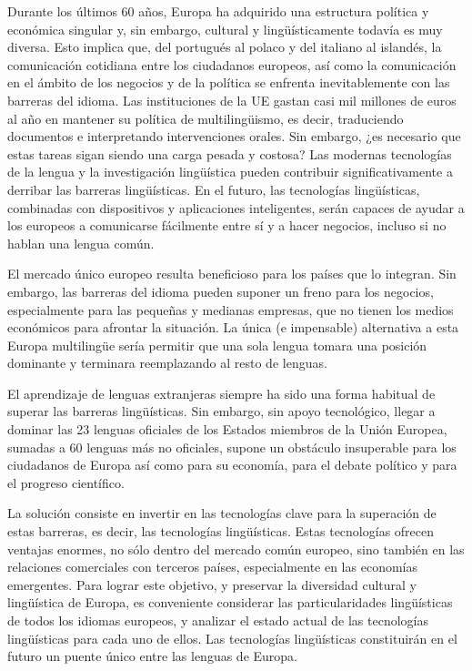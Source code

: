 \vspace*{-4mm}
\begin{multicols}{2}
  Durante los últimos 60 años, Europa ha adquirido una estructura política y económica singular y, sin embargo, cultural y lingüísticamente todavía es muy diversa. Esto implica que, del portugués al polaco y del italiano al islandés, la comunicación cotidiana entre los ciudadanos europeos, así como la comunicación en el ámbito de los negocios y de la política se enfrenta inevitablemente con las barreras del idioma. Las instituciones de la UE gastan casi mil millones de euros al año en mantener su política de multilingüismo, es decir, traduciendo documentos e interpretando intervenciones orales. Sin embargo, ¿es necesario que estas tareas sigan siendo una carga pesada y costosa? Las modernas tecnologías de la lengua y la investigación lingüística pueden contribuir significativamente a derribar las barreras lingüísticas. En el futuro, las tecnologías lingüísticas, combinadas con dispositivos y aplicaciones inteligentes, serán capaces de ayudar a los europeos a comunicarse fácilmente entre sí y a hacer negocios, incluso si no hablan una lengua común.


El mercado único europeo resulta beneficioso para los países que lo integran. Sin embargo, las barreras del idioma pueden suponer un freno para los negocios, especialmente para las pequeñas y medianas empresas, que no tienen los medios económicos para afrontar la situación. La única (e impensable) alternativa a esta Europa multilingüe sería permitir que una sola lengua tomara una posición dominante y terminara reemplazando al resto de lenguas.

El aprendizaje de lenguas extranjeras siempre ha sido una forma habitual de superar las barreras lingüísticas. Sin embargo, sin apoyo tecnológico, llegar a dominar las 23 lenguas oficiales de los Estados miembros de la Unión Europea, sumadas a 60 lenguas más no oficiales, supone un obstáculo insuperable para los ciudadanos de Europa así como para su economía, para el debate político y para el progreso científico.

La solución consiste en invertir en las tecnologías clave para la superación de estas barreras, es decir, las tecnologías lingüísticas. Estas tecnologías ofrecen ventajas enormes, no sólo dentro del mercado común europeo, sino también en las relaciones comerciales con terceros países, especialmente en las economías emergentes. Para lograr este objetivo, y preservar la diversidad cultural y lingüística de Europa, es conveniente considerar las particularidades lingüísticas de todos los idiomas europeos, y analizar el estado actual de las tecnologías lingüísticas para cada uno de ellos. Las tecnologías lingüísticas constituirán en el futuro un puente único entre las lenguas de Europa.


\end{multicols}
